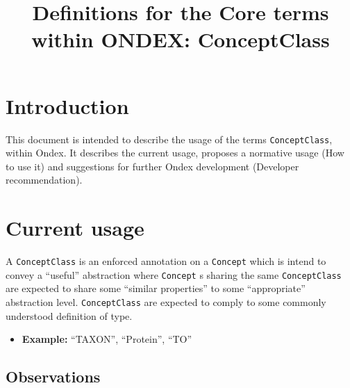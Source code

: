\documentclass[a4paper,10pt]{article}
\title{Definitions for the Core terms within ONDEX: ConceptClass}
\newcommand{\example}[1]{\item\textbf{Example: }#1\xspace}
\newcommand{\term}[1]{\texttt{#1}\xspace}
\newcommand{\cc}{\term{ConceptClass}}
\newcommand{\co}{\term{Concept}}
\begin{document}
\maketitle

\section{Introduction}

This document is intended to describe the usage of the terms \cc,  within Ondex. It describes the current usage, proposes a normative usage (How to use it) and suggestions for further Ondex development (Developer recommendation). 


\section{Current usage}

A \cc is an enforced annotation on a \co which is intend to convey a ``useful'' abstraction where \co s sharing the same \cc are expected to share some ``similar properties'' to some ``appropriate'' abstraction level. \cc are expected to comply to some commonly understood definition of type.

\begin{itemize}
\example{``TAXON'', ``Protein'', ``TO''}
\end{itemize}

\subsection{Observations}
\end{document}
